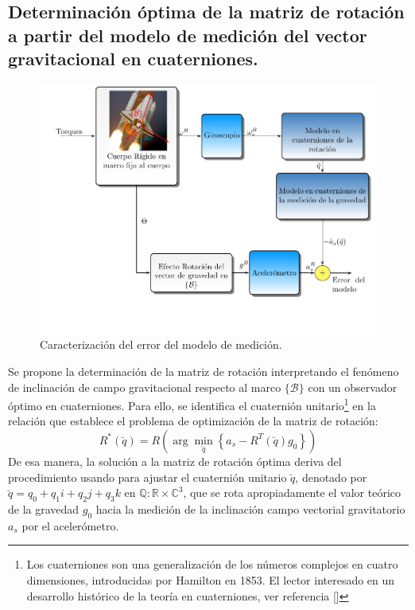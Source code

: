 \documentclass[conference]{IEEEtran}
\newcommand{\marco}[1]{\{\mathcal{#1}\}}
\begin{document}
\subsection{Determinación óptima de la matriz de rotación a partir del modelo de medición del vector gravitacional en cuaterniones.}
\begin{figure} [t]
\begin{center}
\includegraphics[scale=0.50,viewport=20 50 430 330,clip]{ObsOptimo_fig3.pdf}
\caption{Caracterización del error del modelo de medición.}
\label{ObsOptimo_fig2}
\end{center}
\end{figure}
Se propone la determinación de la matriz de rotación interpretando el fenómeno de inclinación de campo gravitacional respecto al marco $\marco{B}$ con un observador óptimo en cuaterniones. Para ello, se identifica el cuaternión unitario\footnote{Los cuaterniones son una generalización de los números complejos en cuatro dimensiones, introducidas por Hamilton en 1853. El lector interesado en un desarrollo histórico de la teoría en cuaterniones, ver referencia [\cite{Warden1976}]}  en la relación que establece el problema de optimización de la matriz de rotación: 
\begin{equation}\label{ProblemaOptimizacionAcc}
R^*(\breve{q})=R\left(\arg\min_{\breve{q}}\left\{a_s-R^T(\breve{q})g_0\right\}\right)
\end{equation} 
De esa manera, la solución a la matriz de rotación óptima deriva del procedimiento usando para ajustar el cuaternión unitario $\breve{q}$, denotado por $\breve{q}=q_0+q_1i+q_2j+q_3k$ en $\mathbb{Q}:\mathbb{R}\times\mathbb{C}^3$, que se rota apropiadamente el valor teórico de la gravedad $g_0$ hacia la medición de la inclinación campo vectorial gravitatorio $a_s$ por el acelerómetro.\par
\end{document}
